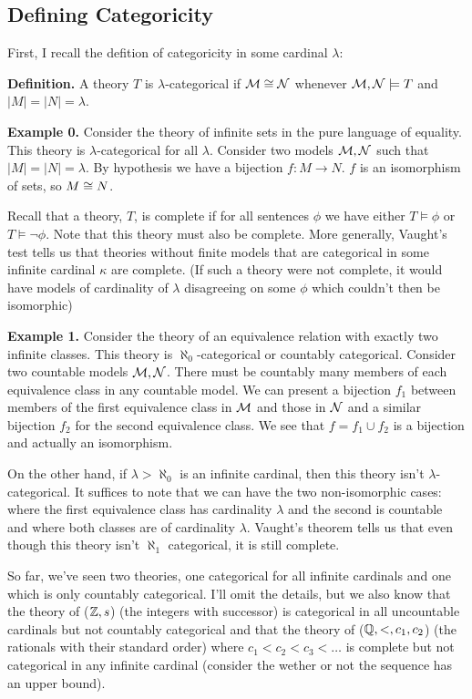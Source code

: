 \subsection{Defining Categoricity}

First, I recall the defition of categoricity in some cardinal \(\lambda\):

\textbf{Definition.} A theory \(T\) is \(\lambda\)-categorical if \(\mathcal{M} \cong \mathcal{N}\) whenever \(\mathcal{M}, \mathcal{N} \models T\) and \(|M| = |N| = \lambda\).

\textbf{Example 0.} Consider the theory of infinite sets in the pure language of equality. 
This theory is \(\lambda\)-categorical for all \(\lambda\).
Consider two models \(\mathcal{M}, \mathcal{N}\) such that \(|M|=|N|=\lambda\). 
By hypothesis we have a bijection \(f: M \to N\). \(f\) is an isomorphism of sets, so \(M \cong N\).

Recall that a theory, \(T\), is complete if for all sentences \(\phi\) we have either \(T \models \phi\) or \(T \models \neg \phi\). 
Note that this theory must also be complete. 
More generally, Vaught's test tells us that theories without finite models that are categorical in some infinite cardinal \(\kappa\) are complete. 
(If such a theory were not complete, it would have models of cardinality of \(\lambda\) disagreeing on some \(\phi\) which couldn't then be isomorphic)

\textbf{Example 1.} Consider the theory of an equivalence relation with exactly two infinite classes. 
This theory is \(\aleph_0\)-categorical or countably categorical. 
Consider two countable models \(\mathcal{M}, \mathcal{N}\). 
There must be countably many members of each equivalence class in any countable model. 
We can present a bijection \(f_1\) between members of the first equivalence class in  \(\mathcal{M}\) and those in \(\mathcal{N}\) and a similar bijection \(f_2\) for the second equivalence class. 
We see that \(f = f_1 \cup f_2\) is a bijection and actually an isomorphism. 

On the other hand, if \(\lambda > \aleph_0\) is an infinite cardinal, then this theory isn't \(\lambda\)-categorical. 
It suffices to note that we can have the two non-isomorphic cases: where the first equivalence class has cardinality \(\lambda\) and the second is countable 
and where both classes are of cardinality \(\lambda\). Vaught's theorem tells us that even though this theory isn't \(\aleph_1\) categorical, it is still complete. 

So far, we've seen two theories, one categorical for all infinite cardinals and one which is only countably categorical. 
I'll omit the details, but we also know that the theory of (\(\mathbb{Z}, s\)) (the integers with successor) is categorical in all uncountable cardinals but not countably categorical and that the theory of (\(\mathbb{Q}, <, c_1, c_2\)) (the rationals with their standard order) where \(c_1 < c_2 < c_3 < \ldots\) is complete but not categorical in any infinite cardinal (consider the wether or not the sequence has an upper bound). 

